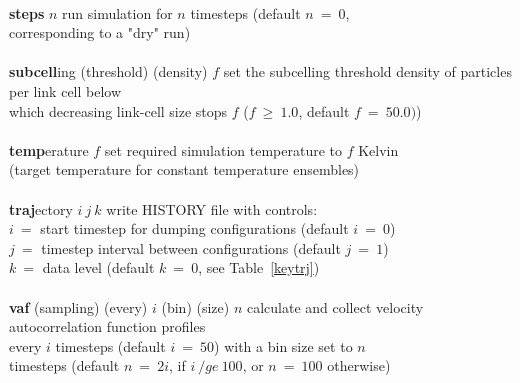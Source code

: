 \begin{tabbing}
\>                                              \> \\
\> {\bf steps} $n$                              \> run simulation for $n$ timesteps (default $n~=~0$, \\
\>                                              \> corresponding to a "dry" run) \\
\>                                              \> \\
\> {\bf subcell}ing (threshold) (density) $f$   \> set the subcelling threshold density of particles per link cell below \\
\>                                              \> which decreasing link-cell size stops $f$ ($f~\ge~1.0$, default $f~=~50.0)$) \\
\>                                              \> \\
\> {\bf temp}erature $f$                        \> set required simulation temperature to $f$ Kelvin \\
\>                                              \> (target temperature for constant temperature ensembles) \\
\>                                              \> \\
\> {\bf traj}ectory $i~j~k$                     \> write HISTORY file with controls: \\
\>                                              \> $i~=$ start timestep for dumping configurations (default $i~=~0$) \\
\>                                              \> $j~=$ timestep interval between configurations (default $j~=~1$) \\
\>                                              \> $k~=$ data level (default $k~=~0$, see Table~\ref{keytrj}) \\
\>                                              \> \\
\> {\bf vaf} (sampling) (every) $i$ (bin) (size) $n$ \> \phantom{xxxx} calculate and collect velocity autocorrelation function profiles \\
\>                                                   \> \phantom{xxxx} every $i$ timesteps (default $i~=~50$) with a bin size set to $n$ \\
\>                                                   \> \phantom{xxxx} timesteps (default $n~=~2i$, if $i~/ge~100$, or $n~=~100$ otherwise) \\
\>                                              \> \\

\end{tabbing}
